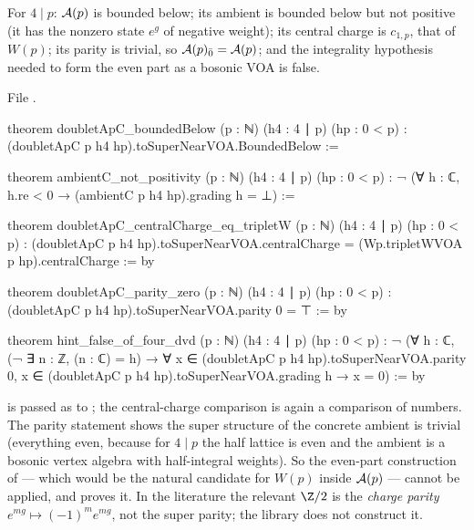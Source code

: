 \begin{theorem}\label{l18:thm:doublet}
For $4\mid p$: $\mathcal{A}(p)$ is bounded below; its ambient is bounded below but not positive (it has the nonzero state $e^{g}$ of negative weight);
its central charge is $c_{1,p}$, that of $W(p)$; its parity is trivial, so $\mathcal{A}(p)_{\bar0}=\mathcal{A}(p)$; and the
integrality hypothesis needed to form the even part as a bosonic VOA is false.
\end{theorem}
\noindent File .
\begin{leancode}
theorem doubletApC_boundedBelow (p : ℕ) (h4 : 4 ∣ p) (hp : 0 < p) :
    (doubletApC p h4 hp).toSuperNearVOA.BoundedBelow :=

theorem ambientC_not_positivity (p : ℕ) (h4 : 4 ∣ p) (hp : 0 < p) :
    ¬ (∀ h : ℂ, h.re < 0 → (ambientC p h4 hp).grading h = ⊥) :=

theorem doubletApC_centralCharge_eq_tripletW (p : ℕ) (h4 : 4 ∣ p) (hp : 0 < p) :
    (doubletApC p h4 hp).toSuperNearVOA.centralCharge = (Wp.tripletWVOA p hp).centralCharge := by

theorem doubletApC_parity_zero (p : ℕ) (h4 : 4 ∣ p) (hp : 0 < p) :
    (doubletApC p h4 hp).toSuperNearVOA.parity 0 = ⊤ := by

theorem hint_false_of_four_dvd (p : ℕ) (h4 : 4 ∣ p) (hp : 0 < p) :
    ¬ (∀ h : ℂ, (¬ ∃ n : ℤ, (n : ℂ) = h) →
        ∀ x ∈ (doubletApC p h4 hp).toSuperNearVOA.parity 0,
          x ∈ (doubletApC p h4 hp).toSuperNearVOA.grading h → x = 0) := by
\end{leancode}
\begin{dictionary}
 is passed as  to ; the central-charge comparison is again a
comparison of numbers. The parity statement shows the super structure of the concrete ambient is trivial (everything
even, because for $4\mid p$ the half lattice is even and the ambient is a bosonic vertex algebra with half-integral
weights). So the even-part construction  of  --- which would be the
natural candidate for $W(p)$ inside $\mathcal{A}(p)$ --- cannot be applied, and  proves it.
In the literature the relevant $\Z/2$ is the \emph{charge parity} $e^{mg}\mapsto(-1)^me^{mg}$, not the super parity;
the library does not construct it.
\end{dictionary}
